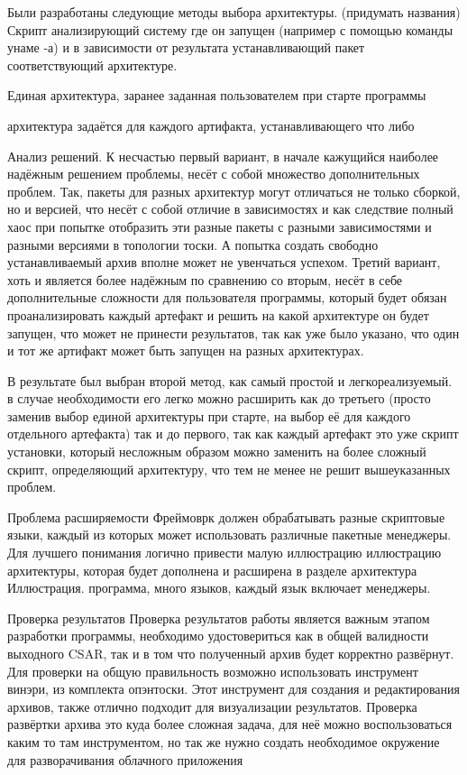 Были разработаны следующие методы выбора архитектуры. 
(придумать названия)
Скрипт анализирующий систему где он запущен (например с помощью команды унаме -а) и в зависимости от результата устанавливающий пакет соответствующий архитектуре. 

Единая архитектура, заранее заданная пользователем при старте программы

архитектура задаётся для каждого артифакта, устанавливающего что либо

Анализ решений. К несчастью первый вариант, в начале кажущийся наиболее надёжным решением проблемы, несёт с собой множество дополнительных проблем. Так, пакеты для разных архитектур могут отличаться не только сборкой, но и версией, что несёт с собой отличие в зависимостях и как следствие полный хаос при попытке отобразить эти разные пакеты с разными зависимостями и разными версиями в топологии тоски. А попытка создать свободно устанавливаемый архив вполне может не увенчаться успехом. 
Третий вариант, хоть и является более надёжным по сравнению со вторым, несёт в себе дополнительные сложности для пользователя программы, который будет обязан проанализировать каждый артефакт и решить на какой архитектуре он будет запущен, что может не принести результатов, так как уже было указано, что один и тот же артифакт может быть запущен на разных архитектурах.

В результате был выбран второй метод, как самый простой и легкореализуемый. в случае необходимости его легко можно расширить как до третьего (просто заменив выбор единой архитектуры при старте, на выбор её для каждого отдельного артефакта) так и до первого, так как каждый артефакт это уже скрипт установки, который несложным образом можно заменить на более сложный скрипт, определяющий архитектуру, что тем не менее не решит вышеуказанных проблем.


Проблема расширяемости
Фреймоврк должен обрабатывать разные скриптовые языки, каждый из которых может использовать различные пакетные менеджеры.
Для лучшего понимания логично привести малую иллюстрацию иллюстрацию архитектуры, которая будет дополнена и расширена в разделе архитектура
Иллюстрация. программа, много языков, каждый язык включает менеджеры.

Проверка результатов
Проверка результатов работы является важным этапом разработки программы, необходимо удостовериться как в общей валидности выходного CSAR, так и в том что полученный архив будет корректно развёрнут. 
Для проверки на общую правильность возможно использовать инструмент винэри, из комплекта опэнтоски. Этот инструмент для создания и редактирования архивов, также отлично подходит для визуализации результатов.
Проверка развёртки архива это куда более сложная задача, для неё можно воспользоваться каким то там инструментом, но так же нужно создать необходимое окружение для разворачивания облачного приложения
 



